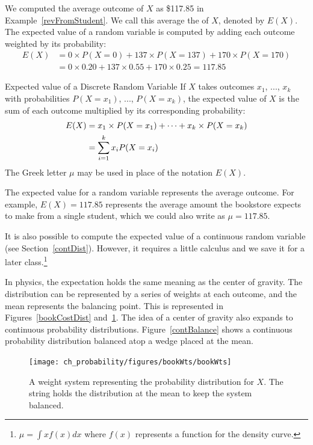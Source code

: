 We computed the average outcome of $X$ as \$117.85 in Example~\ref{revFromStudent}.
We call this average the  of $X$, denoted by $E(X)$.
The expected value of a random variable is computed by adding each outcome weighted by its probability:
\begin{align*}
E(X) &= 0 \times  P(X=0) + 137 \times  P(X=137) + 170 \times  P(X=170) \\
	&= 0 \times  0.20 + 137 \times  0.55 + 170 \times  0.25 = 117.85
\end{align*}

\begin{onebox}{Expected value of a Discrete Random Variable}
If $X$ takes outcomes $x_1$, ..., $x_k$ with probabilities $P(X=x_1)$, ..., $P(X=x_k)$, the expected value of $X$ is the sum of each outcome multiplied by its corresponding probability:
\begin{align}
E(X) 	&= x_1\times P(X=x_1) + \cdots + x_k\times P(X=x_k) \notag \\
	&= \sum_{i=1}^{k}x_iP(X=x_i)
\end{align}
The Greek letter $\mu$ may be used in place of the notation $E(X)$.
\end{onebox}

The expected value for a random variable represents the average outcome. For example, $E(X)=117.85$ represents the average amount the bookstore expects to make from a single student, which we could also write as $\mu=117.85$.

It is also possible to compute the expected value of a continuous random variable (see Section~\ref{contDist}). However, it requires a little calculus and we save it for a later class.\footnote{$\mu = \int xf(x)dx$ where $f(x)$ represents a function for the density curve.}

In physics, the expectation holds the same meaning as the center of gravity. The distribution can be represented by a series of weights at each outcome, and the mean represents the balancing point. This is represented in Figures~\ref{bookCostDist} and~\ref{bookWts}. The idea of a center of gravity also expands to continuous probability distributions. Figure~\ref{contBalance} shows a continuous probability distribution balanced atop a wedge placed at the mean.

\begin{figure}
\centering
\texttt{[image: ch\_probability/figures/bookWts/bookWts]}
\caption{A weight system representing the probability distribution for $X$. The string holds the distribution at the mean to keep the system balanced.}
\label{bookWts}
\end{figure}

